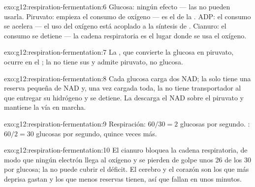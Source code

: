 \begin{solution}{exo:g12:respiration-fermentation:6}
Glucosa: ningún efecto --- las  no pueden usarla.
Piruvato: empieza el consumo de oxígeno --- es el  de la
. ADP: el consumo se acelera --- el uso del oxígeno está
acoplado a la síntesis de . Cianuro: el consumo se detiene --- la
cadena respiratoria es el lugar donde se usa el oxígeno.
\end{solution}

\begin{solution}{exo:g12:respiration-fermentation:7}
La , que convierte la glucosa en piruvato, ocurre en el
; la  no tiene sus  y admite piruvato, no
glucosa.
\end{solution}

\begin{solution}{exo:g12:respiration-fermentation:8}
Cada glucosa carga dos NAD; la  solo tiene una reserva pequeña de
NAD y, una vez cargada toda, la  no tiene transportador al
que entregar su hidrógeno y se detiene. La  descarga el NAD
sobre el piruvato y mantiene la vía en marcha.
\end{solution}

\begin{solution}{exo:g12:respiration-fermentation:9}
Respiración: $60/30 = 2$ glucosas por segundo. : $60/2 = 30$ glucosas por segundo, quince veces más.
\end{solution}

\begin{solution}{exo:g12:respiration-fermentation:10}
El cianuro bloquea la cadena respiratoria, de modo que ningún electrón
llega al oxígeno y se pierden de golpe unos 26 de los 30  por
glucosa; la  no puede cubrir el déficit. El cerebro y el
corazón son los que más deprisa gastan  y los que menos reservas
tienen, así que fallan en unos minutos.
\end{solution}

